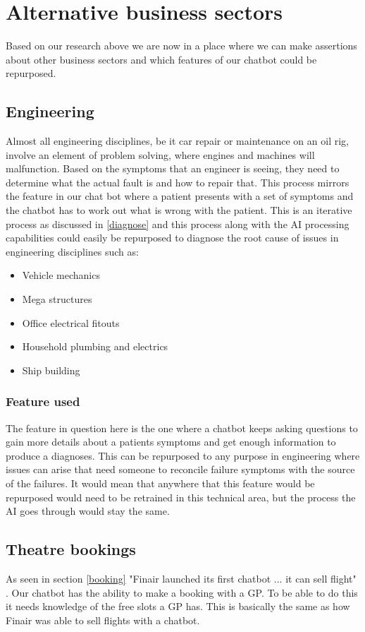 \documentclass{article}
\begin{document}
\section{Alternative business sectors}
Based on our research above we are now in a place where we can make assertions about other business sectors and which features of our chatbot could be repurposed.

\subsection{Engineering}
Almost all engineering disciplines, be it car repair or maintenance on an oil rig, involve an element of problem solving, where engines and machines will malfunction. Based on the symptoms that an engineer is seeing, they need to determine what the actual fault is and how to repair that. This process mirrors the feature in our chat bot where a patient presents with a set of symptoms and the chatbot has to work out what is wrong with the patient. This is an iterative process as discussed in \ref{diagnose} and this process along with the AI processing capabilities could easily be repurposed to diagnose the root cause of issues in engineering disciplines such as:
\begin{itemize}
    \item Vehicle mechanics
    \item Mega structures
    \item Office electrical fitouts
    \item Household plumbing and electrics
    \item Ship building
\end{itemize}
\subsubsection{Feature used}
The feature in question here is the one where a chatbot keeps asking questions to gain more details about a patients symptoms and get enough information to produce a diagnoses. This can be repurposed to any purpose in engineering where issues can arise that need someone to reconcile failure symptoms with the source of the failures. 
It would mean that anywhere that this feature would be repurposed would need to be retrained in this technical area, but the process the AI goes through would stay the same.

\subsection{Theatre bookings}
As seen in section \ref{booking} "Finair launched its first chatbot ... it can sell flight" \cite{booking}. Our chatbot has the ability to make a booking with a GP. To be able to do this it needs knowledge of the free slots a GP has. This is basically the same as how Finair was able to sell flights with a chatbot. 
\end{document}
